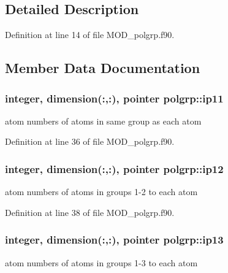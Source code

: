 \subsection{Detailed Description}


Definition at line 14 of file M\-O\-D\-\_\-polgrp.\-f90.



\subsection{Member Data Documentation}
\hypertarget{classpolgrp_aa9a2a7c09067a53711bea451e5d3d8c1}{
\subsubsection[{ip11}]{\setlength{\rightskip}{0pt plus 5cm}integer, dimension(\-:,\-:), pointer polgrp\-::ip11}}\label{classpolgrp_aa9a2a7c09067a53711bea451e5d3d8c1}


atom numbers of atoms in same group as each atom 



Definition at line 36 of file M\-O\-D\-\_\-polgrp.\-f90.

\hypertarget{classpolgrp_a68d24ef189679ee0f25e0d5dfb471b62}{
\subsubsection[{ip12}]{\setlength{\rightskip}{0pt plus 5cm}integer, dimension(\-:,\-:), pointer polgrp\-::ip12}}\label{classpolgrp_a68d24ef189679ee0f25e0d5dfb471b62}


atom numbers of atoms in groups 1-\/2 to each atom 



Definition at line 38 of file M\-O\-D\-\_\-polgrp.\-f90.

\hypertarget{classpolgrp_a4e5e6905b4a0a09de1543cf4dc28e641}{
\subsubsection[{ip13}]{\setlength{\rightskip}{0pt plus 5cm}integer, dimension(\-:,\-:), pointer polgrp\-::ip13}}\label{classpolgrp_a4e5e6905b4a0a09de1543cf4dc28e641}


atom numbers of atoms in groups 1-\/3 to each atom 



